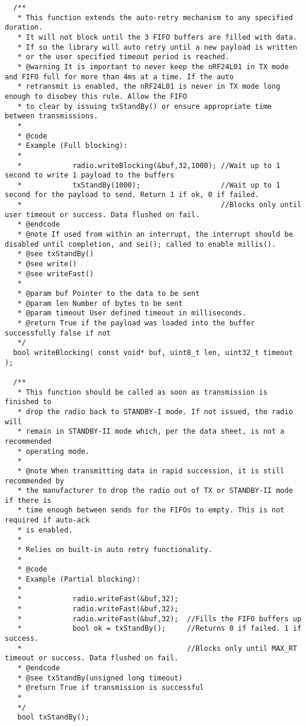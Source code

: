 \documentclass{article}
\begin{document}
\begin{itemize}
\begin{enumerate}
\begin{enumerate}
\begin{lstlisting}
  /**
   * This function extends the auto-retry mechanism to any specified duration.
   * It will not block until the 3 FIFO buffers are filled with data.
   * If so the library will auto retry until a new payload is written
   * or the user specified timeout period is reached.
   * @warning It is important to never keep the nRF24L01 in TX mode and FIFO full for more than 4ms at a time. If the auto
   * retransmit is enabled, the nRF24L01 is never in TX mode long enough to disobey this rule. Allow the FIFO
   * to clear by issuing txStandBy() or ensure appropriate time between transmissions.
   *
   * @code
   * Example (Full blocking):
   *
   *			radio.writeBlocking(&buf,32,1000); //Wait up to 1 second to write 1 payload to the buffers
   *			txStandBy(1000);     			   //Wait up to 1 second for the payload to send. Return 1 if ok, 0 if failed.
   *					  				   		   //Blocks only until user timeout or success. Data flushed on fail.
   * @endcode
   * @note If used from within an interrupt, the interrupt should be disabled until completion, and sei(); called to enable millis().
   * @see txStandBy()
   * @see write()
   * @see writeFast()
   *
   * @param buf Pointer to the data to be sent
   * @param len Number of bytes to be sent
   * @param timeout User defined timeout in milliseconds.
   * @return True if the payload was loaded into the buffer successfully false if not
   */
  bool writeBlocking( const void* buf, uint8_t len, uint32_t timeout );

  /**
   * This function should be called as soon as transmission is finished to
   * drop the radio back to STANDBY-I mode. If not issued, the radio will
   * remain in STANDBY-II mode which, per the data sheet, is not a recommended
   * operating mode.
   *
   * @note When transmitting data in rapid succession, it is still recommended by
   * the manufacturer to drop the radio out of TX or STANDBY-II mode if there is
   * time enough between sends for the FIFOs to empty. This is not required if auto-ack
   * is enabled.
   *
   * Relies on built-in auto retry functionality.
   *
   * @code
   * Example (Partial blocking):
   *
   *			radio.writeFast(&buf,32);
   *			radio.writeFast(&buf,32);
   *			radio.writeFast(&buf,32);  //Fills the FIFO buffers up
   *			bool ok = txStandBy();     //Returns 0 if failed. 1 if success.
   *					  				   //Blocks only until MAX_RT timeout or success. Data flushed on fail.
   * @endcode
   * @see txStandBy(unsigned long timeout)
   * @return True if transmission is successful
   *
   */
   bool txStandBy();


\end{lstlisting}
\end{enumerate}
\end{enumerate}
\end{itemize}
\end{document}
